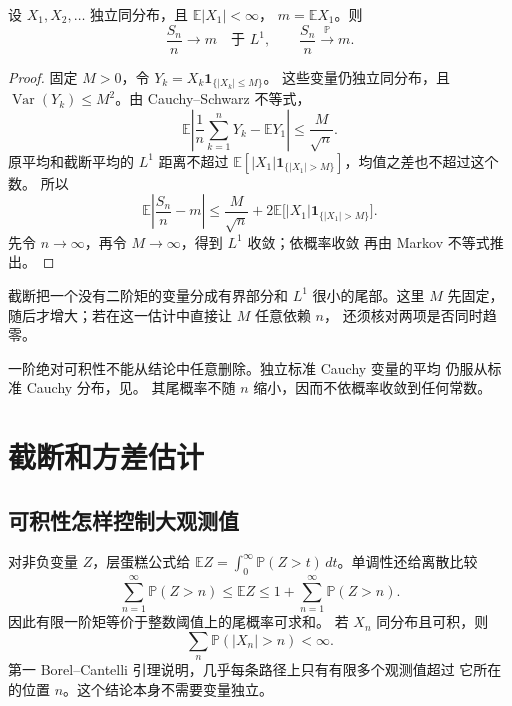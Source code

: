 \begin{theorem}[可积的独立同分布平均]
\label{thm:iid-weak-law-lone}
设 $X_1,X_2,\ldots$ 独立同分布，且 $\mathbb E|X_1|<\infty$，
$m=\mathbb E X_1$。则
\[
 \frac{S_n}{n}\longrightarrow m\quad\text{于 }L^1,
 \qquad \frac{S_n}{n}\xrightarrow{\mathbb P}m.
\]
\end{theorem}

\begin{proof}
固定 $M>0$，令 $Y_k=X_k\mathbf1_{\{|X_k|\le M\}}$。
这些变量仍独立同分布，且 $\operatorname{Var}(Y_k)\le M^2$。由
Cauchy--Schwarz 不等式，
\[
 \mathbb E\left|\frac1n\sum_{k=1}^nY_k-\mathbb EY_1\right|
 \le\frac{M}{\sqrt n}.
\]
原平均和截断平均的 $L^1$ 距离不超过
$\mathbb E[|X_1|\mathbf1_{\{|X_1|>M\}}]$，均值之差也不超过这个数。
所以
\[
 \mathbb E\left|\frac{S_n}{n}-m\right|
 \le\frac M{\sqrt n}
      +2\mathbb E\bigl[|X_1|\mathbf1_{\{|X_1|>M\}}\bigr].
\]
先令 $n\to\infty$，再令 $M\to\infty$，得到 $L^1$ 收敛；依概率收敛
再由 Markov 不等式推出。
\end{proof}

截断把一个没有二阶矩的变量分成有界部分和 $L^1$ 很小的尾部。这里
$M$ 先固定，随后才增大；若在这一估计中直接让 $M$ 任意依赖 $n$，
还须核对两项是否同时趋零。

一阶绝对可积性不能从结论中任意删除。独立标准 Cauchy 变量的平均
仍服从标准 Cauchy 分布，见。
其尾概率不随 $n$ 缩小，因而不依概率收敛到任何常数。

\section{截断和方差估计}
\label{sec:truncation-tail-variance}

\subsection{可积性怎样控制大观测值}

对非负变量 $Z$，层蛋糕公式给
$\mathbb E Z=\int_0^\infty\mathbb P(Z>t)\,dt$。单调性还给离散比较
\begin{equation}
\label{eq:tail-sum-integrability}
 \sum_{n=1}^\infty\mathbb P(Z>n)
 \le\mathbb E Z
 \le1+\sum_{n=1}^\infty\mathbb P(Z>n).
\end{equation}
因此有限一阶矩等价于整数阈值上的尾概率可求和。
若 $X_n$ 同分布且可积，则
\[
 \sum_n\mathbb P(|X_n|>n)<\infty.
\]
第一 Borel--Cantelli 引理说明，几乎每条路径上只有有限多个观测值超过
它所在的位置 $n$。这个结论本身不需要变量独立。


